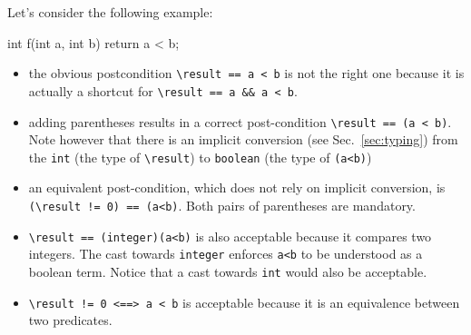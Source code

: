 

Let's consider the following example:
\begin{c}
  int f(int a, int b) { return a < b; }
\end{c}
\begin{itemize}
\item the obvious postcondition \verb|\result == a < b| is not the
  right one because it is
  actually a shortcut for \verb|\result == a && a < b|.
\item adding parentheses results in a correct post-condition
  \verb|\result == (a < b)|. Note however that there is an implicit
  conversion (see Sec.~\ref{sec:typing})
  from the \verb|int| (the type of \verb|\result|) to
  \verb|boolean| (the type of \verb|(a<b)|)
\item an equivalent post-condition, which does not rely on implicit
  conversion, is \verb|(\result != 0) == (a<b)|. Both pairs of
  parentheses are mandatory.
\item \verb|\result == (integer)(a<b)| is also acceptable because it compares
  two integers. The cast towards \verb|integer| enforces
  \verb|a<b| to be understood as a boolean term. Notice that a cast
  towards \verb|int| would also be acceptable.
\item \verb|\result != 0 <==> a < b| is acceptable because it is an
  equivalence between two predicates.
\end{itemize}
